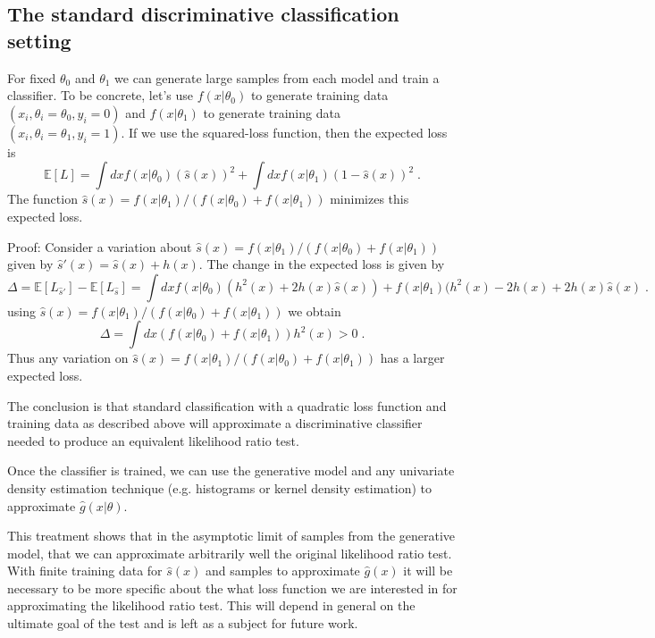 \documentclass[11pt, oneside]{article}   	%
\begin{document}
\subsection{The standard discriminative classification setting} For fixed $\theta_0$ and $\theta_1$ we can generate 
large samples from each model and train a classifier. To be concrete, let's use $f(x|\theta_0)$ to generate training 
data $(x_i, \theta_i=\theta_0, y_i=0)$ and $f(x|\theta_1)$ to generate training data $(x_i, \theta_i=\theta_1, y_i=1)$. 
If we use the squared-loss function, then the expected loss is
\begin{equation}
\mathbb{E}[L] = \int dx f(x|\theta_0)  (  \hat{s}(x) )^2  + \int dx f(x|\theta_1)  ( 1 - \hat{s}(x) )^2 \; .
\end{equation}
The function $\hat{s}(x) = f(x|\theta_1)/(f(x|\theta_0)+f(x|\theta_1))$ minimizes this expected loss.

Proof: Consider a variation about $\hat{s}(x) = f(x|\theta_1)/(f(x|\theta_0)+f(x|\theta_1))$ given by $\hat{s}'(x) = \hat{s}(x) +h(x)$. The change in the expected loss is given by 
\begin{equation}
\Delta = \mathbb{E}[L_{\hat{s}'}]-\mathbb{E}[L_{\hat{s}}] = \int dx f(x|\theta_0)  (h^2(x) + 2 h(x)  \hat{s}(x) )  + f(x|\theta_1)   (h^2(x) - 2 h(x) + 2 h(x) \hat{s}(x)  \; .
\end{equation}
using $\hat{s}(x) = f(x|\theta_1)/(f(x|\theta_0)+f(x|\theta_1))$ we obtain
\begin{equation}
\Delta =  \int dx (f(x|\theta_0)+f(x|\theta_1))  h^2(x) >0    \; .
\end{equation}
Thus any variation on $\hat{s}(x) = f(x|\theta_1)/(f(x|\theta_0)+f(x|\theta_1))$ has a larger expected loss.

The conclusion is that standard classification with a quadratic loss function and training data as described above will approximate a discriminative classifier needed to produce an equivalent likelihood ratio test.

Once the classifier is trained, we can use the generative model and any univariate density estimation technique (e.g. histograms or kernel density estimation) to approximate $\hat{g}(x|\theta)$.

This treatment shows that in the asymptotic limit of samples from the generative model, that we can approximate arbitrarily well the original likelihood ratio test. With finite training data for $\hat{s}(x)$ and samples to approximate $\hat{g}(x)$ it will be necessary to be more specific about the what loss function we are interested in for approximating the likelihood ratio test. This will depend in general on the ultimate goal of the test and is left as a subject for future work.
\end{document}
